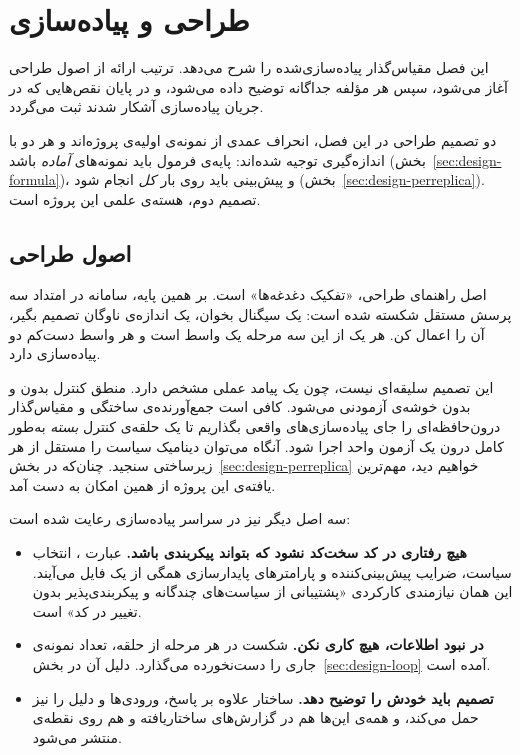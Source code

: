 \chapter{طراحی و پیاده‌سازی}
\label{ch:design}

این فصل مقیاس‌گذار پیاده‌سازی‌شده را شرح می‌دهد. ترتیب ارائه از اصول طراحی آغاز می‌شود، سپس
هر مؤلفه جداگانه توضیح داده می‌شود، و در پایان نقص‌هایی که در جریان پیاده‌سازی آشکار شدند ثبت
می‌گردد.

دو تصمیم طراحی در این فصل، انحراف عمدی از نمونه‌ی اولیه‌ی پروژه‌اند و هر دو با اندازه‌گیری
توجیه شده‌اند: پایه‌ی فرمول باید نمونه‌های \emph{آماده} باشد (بخش~\ref{sec:design-formula})،
و پیش‌بینی باید روی بار \emph{کل} انجام شود (بخش~\ref{sec:design-perreplica}). تصمیم دوم،
هسته‌ی علمی این پروژه است.

\section{اصول طراحی}
\label{sec:design-principles}

اصل راهنمای طراحی، «تفکیک دغدغه‌ها» است. بر
همین پایه، سامانه در امتداد سه پرسش مستقل شکسته شده است: یک سیگنال بخوان، یک اندازه‌ی ناوگان
تصمیم بگیر، آن را اعمال کن. هر یک از این سه مرحله یک واسط است و هر واسط دست‌کم دو پیاده‌سازی
دارد.

این تصمیم سلیقه‌ای نیست، چون یک پیامد عملی مشخص دارد. منطق کنترل بدون  و بدون
خوشه‌ی  آزمودنی می‌شود. کافی است جمع‌آورنده‌ی ساختگی و مقیاس‌گذار
درون‌حافظه‌ای را جای پیاده‌سازی‌های واقعی بگذاریم تا یک حلقه‌ی کنترل \emph{بسته} به‌طور کامل
درون یک آزمون واحد اجرا شود. آنگاه می‌توان دینامیک سیاست را مستقل از هر زیرساختی سنجید.
چنان‌که در بخش~\ref{sec:design-perreplica} خواهیم دید، مهم‌ترین یافته‌ی این پروژه از همین
امکان به دست آمد.

سه اصل دیگر نیز در سراسر پیاده‌سازی رعایت شده است:

\begin{itemize}
  \item \textbf{هیچ رفتاری در کد سخت‌کد نشود که بتواند پیکربندی باشد.} عبارت ،
  انتخاب سیاست، ضرایب پیش‌بینی‌کننده و پارامترهای پایدارسازی همگی از یک فایل 
  می‌آیند. این همان نیازمندی کارکردی «پشتیبانی از سیاست‌های چندگانه و پیکربندی‌پذیر بدون
  تغییر در کد» است.
  \item \textbf{در نبود اطلاعات، هیچ کاری نکن.} شکست در هر مرحله از حلقه، تعداد نمونه‌ی جاری
  را دست‌نخورده می‌گذارد. دلیل آن در بخش~\ref{sec:design-loop} آمده است.
  \item \textbf{تصمیم باید خودش را توضیح دهد.} ساختار  علاوه بر پاسخ، ورودی‌ها و
  دلیل را نیز حمل می‌کند، و همه‌ی این‌ها هم در گزارش‌های ساختاریافته و هم روی نقطه‌ی
   منتشر می‌شود.
\end{itemize}

